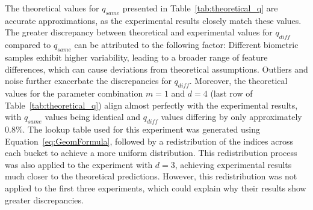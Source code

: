 The theoretical values for \(q_{same}\) presented in Table~\ref{tab:theoretical_q} are accurate approximations, as the experimental results closely match these values. The greater discrepancy between theoretical and experimental values for \(q_{diff}\) compared to \(q_{same}\) can be attributed to the following factor: Different biometric samples exhibit higher variability, leading to a broader range of feature differences, which can cause deviations from theoretical assumptions. Outliers and noise further exacerbate the discrepancies for \(q_{diff}\). Moreover, the theoretical values for the parameter combination \(m=1\) and \(d=4\) (last row of Table~\ref{tab:theoretical_q}) align almost perfectly with the experimental results, with \(q_{same}\) values being identical and \(q_{diff}\) values differing by only approximately 0.8\%. The lookup table used for this experiment was generated using Equation~\ref{eq:GeomFormula}, followed by a redistribution of the indices across each bucket to achieve a more uniform distribution. This redistribution process was also applied to the experiment with \(d = 3\), achieving experimental results much closer to the theoretical predictions. However, this redistribution was not applied to the first three experiments, which could explain why their results show greater discrepancies.




